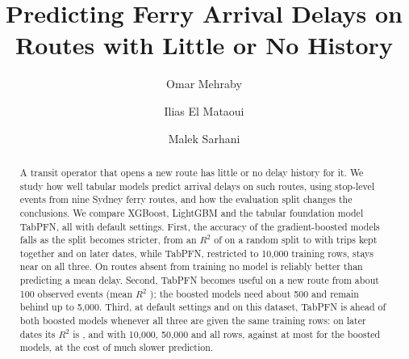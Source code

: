 \documentclass[runningheads]{llncs}
\begin{document}
\title{Predicting Ferry Arrival Delays on Routes with Little or No History}


\author{Omar Mehraby \and Ilias El Mataoui \and Malek Sarhani}

\maketitle

\begin{abstract}
A transit operator that opens a new route has little or no delay history for
it. We study how well tabular models predict arrival delays on such routes,
using \Events{} stop-level events from nine Sydney ferry routes, and how the
evaluation split changes the conclusions. We compare XGBoost, LightGBM and the
tabular foundation model TabPFN, all with default settings. First, the accuracy of the gradient-boosted models falls as
the split becomes stricter, from an $R^2$ of  on a random
split to  with trips kept together and 
on later dates, while TabPFN, restricted to 10{,}000 training rows, stays near
 on all three. On routes absent from training no model is
reliably better than predicting a mean delay. Second, TabPFN becomes useful
on a new route from about 100 observed events (mean $R^2$
); the boosted models need about 500 and remain behind
up to 5{,}000. Third, at default settings and on this dataset, TabPFN is
ahead of both boosted models whenever all three are given the same training
rows: on later dates its $R^2$ is ,
 and  with 10{,}000,
50{,}000 and all rows, against at most  for the
boosted models, at the cost of much slower prediction.

\end{abstract}
\end{document}
